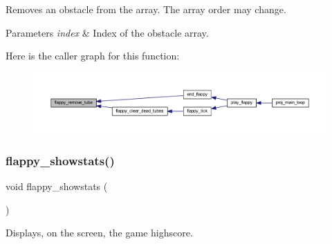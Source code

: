 Removes an obstacle from the array. The array order may change. 


\begin{DoxyParams}{Parameters}
{\em index} & Index of the obstacle array. \\
\hline
\end{DoxyParams}
Here is the caller graph for this function\+:\nopagebreak
\begin{figure}[H]
\begin{center}
\leavevmode
\includegraphics[width=350pt]{group__flappy_ga674a35d4936f4ab784c85addd4b4b830_icgraph}
\end{center}
\end{figure}
\mbox{\label{group__flappy_ga2a15bc1d4bff96014dcaa54973162a48}} 
\subsubsection{\texorpdfstring{flappy\+\_\+showstats()}{flappy\_showstats()}}
{\footnotesize\ttfamily void flappy\+\_\+showstats (\begin{DoxyParamCaption}{ }\end{DoxyParamCaption})}



Displays, on the screen, the game highscore. 

